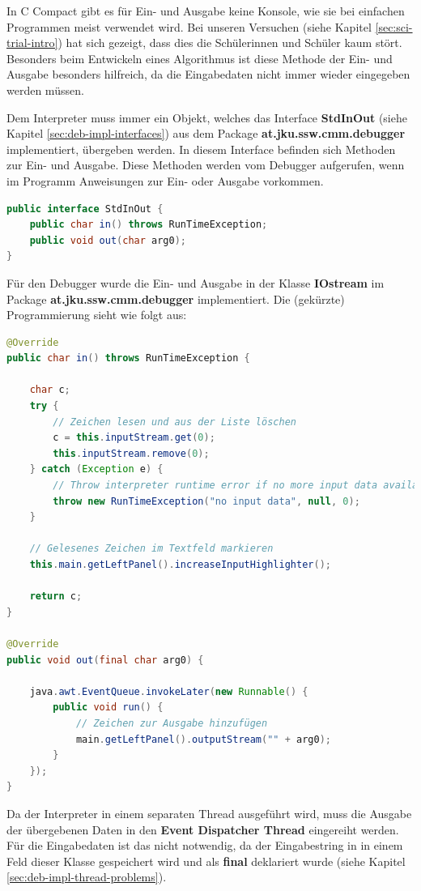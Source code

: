 In C Compact gibt es für Ein- und Ausgabe keine Konsole, wie sie bei einfachen Programmen meist verwendet wird. Bei unseren Versuchen (siehe Kapitel \ref{sec:sci-trial-intro}) hat sich gezeigt, dass dies die Schülerinnen und Schüler kaum stört. Besonders beim Entwickeln eines Algorithmus ist diese Methode der Ein- und Ausgabe besonders hilfreich, da die Eingabedaten nicht immer wieder eingegeben werden müssen.

Dem Interpreter muss immer ein Objekt, welches das Interface \textbf{StdInOut} (siehe Kapitel \ref{sec:deb-impl-interfaces}) aus dem Package \textbf{at.jku.ssw.cmm.debugger} implementiert, übergeben werden. In diesem Interface befinden sich Methoden zur Ein- und Ausgabe. Diese Methoden werden vom Debugger aufgerufen, wenn im Programm Anweisungen zur Ein- oder Ausgabe vorkommen.

\begin{lstlisting}[language=JAVA]
public interface StdInOut {
	public char in() throws RunTimeException;
	public void out(char arg0);
}
\end{lstlisting}

Für den Debugger wurde die Ein- und Ausgabe in der Klasse \textbf{IOstream} im Package \textbf{at.jku.ssw.cmm.debugger} implementiert. Die (gekürzte) Programmierung sieht wie folgt aus:

\begin{lstlisting}[language=JAVA]
@Override
public char in() throws RunTimeException {

	char c;
	try {
		// Zeichen lesen und aus der Liste löschen
		c = this.inputStream.get(0);
		this.inputStream.remove(0);
	} catch (Exception e) {
		// Throw interpreter runtime error if no more input data available
		throw new RunTimeException("no input data", null, 0);
	}
	
	// Gelesenes Zeichen im Textfeld markieren
	this.main.getLeftPanel().increaseInputHighlighter();
	
	return c;
}

@Override
public void out(final char arg0) {

	java.awt.EventQueue.invokeLater(new Runnable() {
		public void run() {
			// Zeichen zur Ausgabe hinzufügen
			main.getLeftPanel().outputStream("" + arg0);
		}
	});
}
\end{lstlisting}

Da der Interpreter in einem separaten Thread ausgeführt wird, muss die Ausgabe der übergebenen Daten in den \textbf{Event Dispatcher Thread} eingereiht werden. Für die Eingabedaten ist das nicht notwendig, da der Eingabestring in in einem Feld dieser Klasse gespeichert wird und als \textbf{final} deklariert wurde (siehe Kapitel \ref{sec:deb-impl-thread-problems}).

